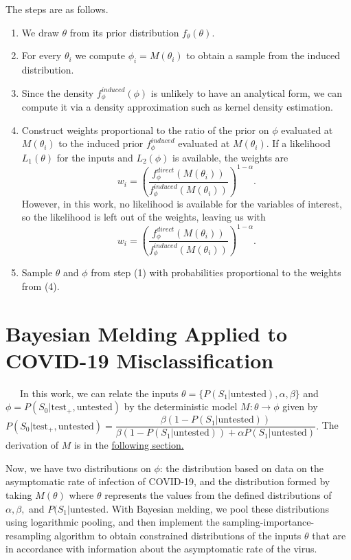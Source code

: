 \documentclass[12pt,twoside]{smiththesis}
\providecommand{\tightlist}{%
  \setlength{\itemsep}{0pt}\setlength{\parskip}{0pt}}
\begin{document}
The steps are as follows.
\begin{enumerate}
\def\labelenumi{\arabic{enumi}.}
\tightlist
\item
  We draw \(\theta\) from its prior distribution \(f_\theta(\theta)\).
\item
  For every \(\theta_i\) we compute \(\phi_i = M(\theta_i)\) to obtain a sample from the induced distribution.
\item
  Since the density \(f_\phi^{induced}(\phi)\) is unlikely to have an analytical form, we can compute it via a density approximation such as kernel density estimation.
\item
  Construct weights proportional to the ratio of the prior on \(\phi\) evaluated at \(M(\theta_i)\) to the induced prior \(f_\phi^{induced}\) evaluated at \(M(\theta_i)\). If a likelihood \(L_1(\theta)\) for the inputs and \(L_2(\phi)\) is available, the weights are
  \[w_i = \left( \frac{f_\phi^{direct}(M(\theta_i))}{f_\phi^{induced}(M(\theta_i))} \right)^{1-\alpha}.\]
  However, in this work, no likelihood is available for the variables of interest, so the likelihood is left out of the weights, leaving us with
  \[w_i = \left( \frac{f_\phi^{direct}(M(\theta_i))}{f_\phi^{induced}(M(\theta_i))} \right)^{1-\alpha}.\]
\item
  Sample \(\theta\) and \(\phi\) from step (1) with probabilities proportional to the weights from (4).
\end{enumerate}
\newpage

\hypertarget{bayesian-melding-applied-to-covid-19-misclassification}{%
\section{Bayesian Melding Applied to COVID-19 Misclassification}\label{bayesian-melding-applied-to-covid-19-misclassification}}

~~~In this work, we can relate the inputs \(\theta = \{P(S_1|\text{untested}), \alpha, \beta \}\) and \(\phi = P(S_0|\text{test}_+,\text{untested})\) by the deterministic model \(M: \theta \to \phi\) given by \(P(S_0|\text{test}_+, \text{untested}) = \dfrac{\beta(1 - P(S_1|\text{untested}))}{\beta(1-P(S_1|\text{untested})) + \alpha P(S_1|\text{untested})}.\) The derivation of \(M\) is in the \protect\hyperlink{derivation}{following section.}

Now, we have two distributions on \(\phi\): the distribution based on data on the asymptomatic rate of infection of COVID-19, and the distribution formed by taking \(M(\theta)\) where \(\theta\) represents the values from the defined distributions of \(\alpha,\beta,\) and \(P(S_1|\text{untested}\). With Bayesian melding, we pool these distributions using logarithmic pooling, and then implement the sampling-importance-resampling algorithm to obtain constrained distributions of the inputs \(\theta\) that are in accordance with information about the asymptomatic rate of the virus.
\end{document}
